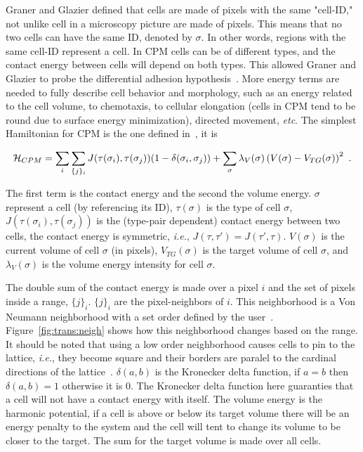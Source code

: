 Graner and Glazier defined that cells are made of pixels with the same "cell-ID," not unlike cell in a microscopy picture are made of pixels.
This means that no two cells
can have the same ID,
denoted by $\sigma$. In other words, 
regions 
with the same cell-ID represent a cell. In CPM cells can be of different types, and the contact energy between cells will depend on both types. This allowed Graner and Glazier to probe the differential adhesion hypothesis~\cite{graner1992simulation}. More energy terms are needed to fully describe cell behavior and morphology,
such as an energy related to the cell volume, to chemotaxis, to cellular elongation (cells in CPM tend to be round due to surface energy minimization), directed movement, \textit{etc}. The simplest Hamiltonian for CPM is the one defined in~\cite{graner1992simulation}, it is

\begin{equation}\label{eq:abm:cpm-hamiltonian}
\mathcal{H}_{CPM} = \sum_i \sum_{\{j\}_i} J(\tau(\sigma_i),\tau(\sigma_j))(1 - \delta(\sigma_i,\sigma_j)) + \sum_{\sigma}\lambda_V(\sigma)\left(V(\sigma) - V_{TG}(\sigma)\right)^2\,\,.
\end{equation}

\noindent The first term is the contact energy and the second the volume energy. $\sigma$ represent a cell (by referencing its ID), $\tau(\sigma)$ is the type of cell $\sigma$, $J(\tau(\sigma_i),\tau(\sigma_j))$ is the (type-pair dependent) contact energy between two cells, the contact energy is symmetric, \textit{i.e.}, $J(\tau,\tau') = J(\tau',\tau)$. $V(\sigma)$ is the current volume of cell $\sigma$ (in pixels), $V_{TG}(\sigma)$ is the target volume of cell $\sigma$, and $\lambda_V(\sigma)$ is the volume energy intensity for cell $\sigma$. 

The double sum of the contact energy is made over a pixel $i$ and the set of pixels inside a range, $\{j\}_i$. $\{j\}_i$ are the pixel-neighbors of $i$. This neighborhood is a Von Neumann neighborhood with a set order defined by the user~\cite{swat_multi-scale_2012}. Figure~\ref{fig:trans:neigh} shows how this neighborhood changes based on the range. It should be noted that using a low order neighborhood causes cells to pin to the lattice, \textit{i.e.}, they become square and their borders are paralel to the cardinal directions of the lattice~\cite{holm1991effects}. 
$\delta(a, b)$ is the Kronecker delta function, if $a=b$ then $\delta(a, b)=1$ otherwise it is 0.
The Kronecker delta function here guaranties that a cell will not have a contact energy with itself. The volume energy is the harmonic potential, if a cell is above or below its target volume there will be an energy penalty to the system and the cell will tent to
change its volume to be closer to the target. The sum for the target volume is made over all cells. 

